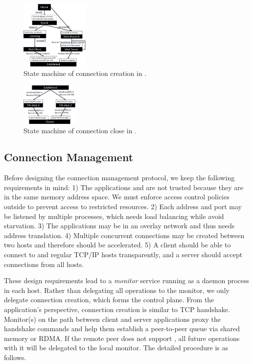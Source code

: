 \begin{figure}[t!]
	\centering
	\includegraphics[width=0.3\textwidth]{images/conn-setup-new}
	\vspace{-5pt}
	\caption{State machine of connection creation in \libipc{}.}
	\vspace{-10pt}
	\label{fig:conn-setup}
\end{figure}
\begin{figure}[t!]
	\centering
	\includegraphics[width=0.25\textwidth]{images/conn-close-new}
	\vspace{-5pt}
	\caption{State machine of connection close in \libipc{}.}
	\label{fig:conn-close}
	\vspace{-15pt}
\end{figure}


\subsection{Connection Management}
\label{subsec:connection-management}

Before designing the connection management protocol, we keep the following requirements in mind:
1) The applications and \libipc{} are not trusted because they are in the same memory address space. We must enforce access control policies outside \libipc{} to prevent access to restricted resources.
2) Each address and port may be listened by multiple processes, which needs load balancing while avoid starvation.
3) The applications may be in an overlay network and thus needs address translation. 
4) Multiple concurrent connections may be created between two hosts and therefore should be accelerated.
5) A client should be able to connect to \sys{} and regular TCP/IP hosts transparently, and a server should accept connections from all hosts.

These design requirements lead to a \emph{monitor} service running as a daemon process in each host.
Rather than delegating all operations to the monitor, we only delegate connection creation, which forms the control plane.
From the application's perspective, connection creation is similar to TCP handshake.
Monitor(s) on the path between client and server applications proxy the handshake commands and help them establish a peer-to-peer queue via shared memory or RDMA.
If the remote peer does not support \sys{}, all future operations with it will be delegated to the local monitor.
The detailed procedure is as follows.

